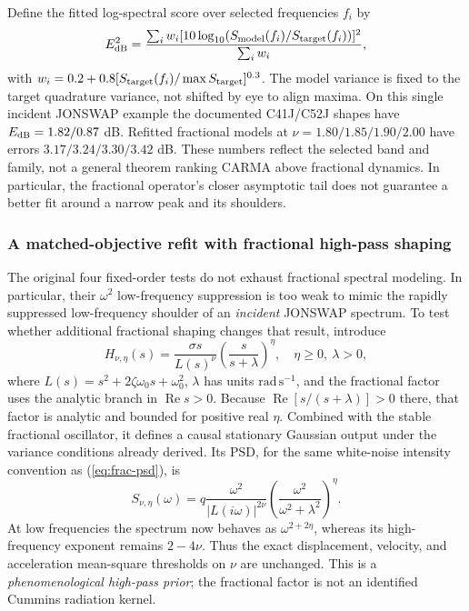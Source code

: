 Define the fitted log-spectral score over selected frequencies \(f_i\) by
\begin{equation}
E_{\rm dB}^2=
\frac{\sum_i w_i
 [10\log_{10}(S_{\rm model}(f_i)/S_{\rm target}(f_i))]^2}
 {\sum_i w_i},
\label{eq:frac-fit-objective}
\end{equation}
with
\(w_i=0.2+0.8[S_{\rm target}(f_i)/\max S_{\rm target}]^{0.3}\).
The model variance is fixed to the target quadrature variance, not
shifted by eye to align maxima. On this single incident JONSWAP
example the documented C41J/C52J shapes have \(E_{\rm dB}=1.82/0.87\)
dB. Refitted fractional models at \(\nu=1.80/1.85/1.90/2.00\)
have errors \(3.17/3.24/3.30/3.42\) dB. These numbers reflect
the selected band and family, not a general theorem ranking CARMA
above fractional dynamics. In particular, the fractional operator's
closer asymptotic tail does not guarantee a better fit around a
narrow peak and its shoulders.

\subsubsection{A matched-objective refit with fractional high-pass shaping}
The original four fixed-order tests do not exhaust fractional
spectral modeling. In particular, their \(\omega^2\) low-frequency
suppression is too weak to mimic the rapidly suppressed low-frequency
shoulder of an \emph{incident} JONSWAP spectrum. To test whether
additional fractional shaping changes that result, introduce
\begin{equation}
H_{\nu,\eta}(s)=\frac{\sigma s}{L(s)^\nu}
  \left(\frac{s}{s+\lambda}\right)^\eta,
\quad \eta\geq0,\ \lambda>0,
\label{eq:frac-highpass}
\end{equation}
where \(L(s)=s^2+2\zeta\omega_0s+\omega_0^2\),
\(\lambda\) has units \(\mathrm{rad\,s^{-1}}\),
and the fractional factor uses the analytic branch in
\(\operatorname{Re}s>0\). Because
\(\operatorname{Re}[s/(s+\lambda)]>0\) there, that factor is
analytic and bounded for positive real \(\eta\). Combined with
the stable fractional oscillator, it defines a causal stationary
Gaussian output under the variance conditions already derived.
Its PSD, for the same white-noise intensity convention as
(\ref{eq:frac-psd}), is
\begin{equation}
S_{\nu,\eta}(\omega)=q\frac{\omega^2}{|L(i\omega)|^{2\nu}}
\left(\frac{\omega^2}{\omega^2+\lambda^2}\right)^\eta.
\label{eq:frac-highpass-psd}
\end{equation}
At low frequencies the spectrum now behaves as
\(\omega^{2+2\eta}\), whereas its high-frequency exponent
remains \(2-4\nu\). Thus the exact displacement, velocity,
and acceleration mean-square thresholds on \(\nu\) are unchanged.
This is a \emph{phenomenological high-pass prior}; the
fractional factor is not an identified Cummins radiation kernel.

